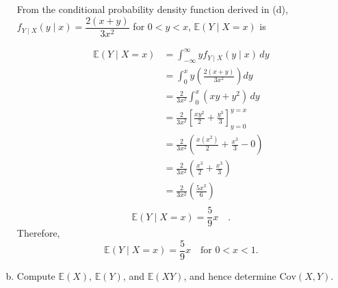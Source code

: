 \documentclass[letterpaper,12pt]{article}
\begin{document}
\begin{enumerate}[(a)]
\begin{list}{}{}
        From the conditional probability density function derived in (d), $f_{Y \mid X}(y \mid x) = \dfrac{2(x+y)}{3x^2}$ for $0 < y < x$, $\mathbb{E}(Y \mid X = x)$ is 

        \begin{align*}
        \mathbb{E}(Y \mid X = x) &= \int_{-\infty}^{\infty} y f_{Y \mid X}(y \mid x) \, dy \\
        &= \int_{0}^{x} y \left( \frac{2(x+y)}{3x^2} \right) dy \\
        &= \frac{2}{3x^2} \int_{0}^{x} (xy + y^2) \, dy \\
        &= \frac{2}{3x^2} \left[ \frac{x y^2}{2} + \frac{y^3}{3} \right]_{y=0}^{y=x} \\
        &= \frac{2}{3x^2} \left( \frac{x(x^2)}{2} + \frac{x^3}{3} - 0 \right) \\
        &= \frac{2}{3x^2} \left( \frac{x^3}{2} + \frac{x^3}{3} \right) \\
        &= \frac{2}{3x^2} \left( \frac{5x^3}{6} \right) \\
        \end{align*}
        \[         \boxed{\mathbb{E}(Y \mid X = x) = \frac{5}{9}x \quad}.\]
        Therefore,
        \[        \mathbb{E}(Y \mid X = x) = \frac{5}{9}x \quad \text{for } 0 < x < 1.\]
    \end{list}
    \item Compute $\mathbb{E}(X)$, $\mathbb{E}(Y)$, and $\mathbb{E}(XY)$, and hence determine $\text{Cov}(X, Y)$.
    \vspace{0.5em}
\end{enumerate}
\end{document}
